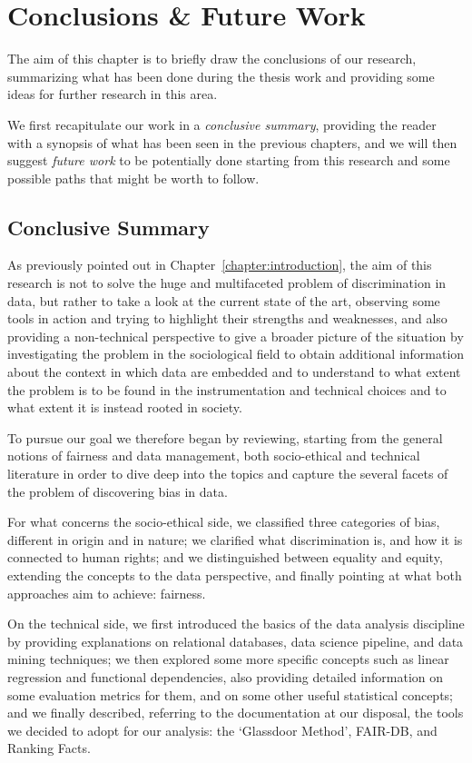 \chapter{Conclusions \& Future Work}
\label{chapter:conclusions_future_work}
\thispagestyle{empty}

The aim of this chapter is to briefly draw the conclusions of our research, summarizing what has been done during the thesis work and providing some ideas for further research in this area.

We first recapitulate our work in a \textit{conclusive summary}, providing the reader with a synopsis of what has been seen in the previous chapters, and we will then suggest \textit{future work} to be potentially done starting from this research and some possible paths that might be worth to follow.


\section{Conclusive Summary}
As previously pointed out in Chapter~\ref{chapter:introduction}, the aim of this research is not to solve the huge and multifaceted problem of discrimination in data, but rather to take a look at the current state of the art, observing some tools in action and trying to highlight their strengths and weaknesses, and also providing a non-technical perspective to give a broader picture of the situation by investigating the problem in the sociological field to obtain additional information about the context in which data are embedded and to understand to what extent the problem is to be found in the instrumentation and technical choices and to what extent it is instead rooted in society.

To pursue our goal we therefore began by reviewing, starting from the general notions of fairness and data management, both socio-ethical and technical literature in order to dive deep into the topics and capture the several facets of the problem of discovering bias in data.

For what concerns the socio-ethical side, we classified three categories of bias, different in origin and in nature; we clarified what discrimination is, and how it is connected to human rights; and we distinguished between equality and equity, extending the concepts to the data perspective, and finally pointing at what both approaches aim to achieve: fairness.

On the technical side, we first introduced the basics of the data analysis discipline by providing explanations on relational databases, data science pipeline, and data mining techniques; we then explored some more specific concepts such as linear regression and functional dependencies, also providing detailed information on some evaluation metrics for them, and on some other useful statistical concepts; and we finally described, referring to the documentation at our disposal, the tools we decided to adopt for our analysis: the `Glassdoor Method', FAIR-DB, and Ranking Facts.

